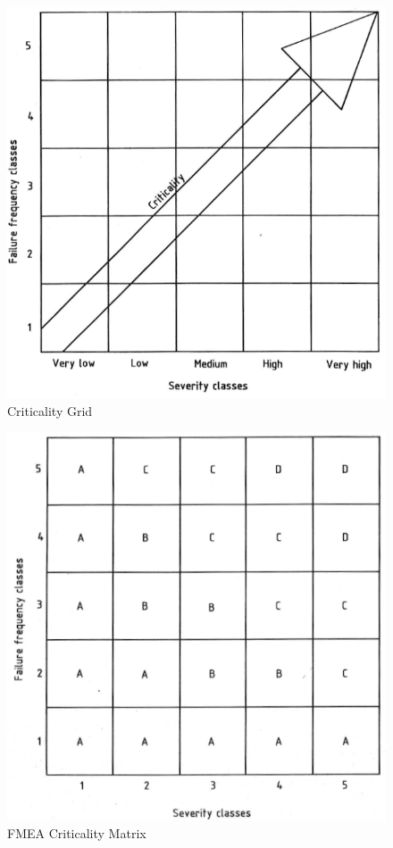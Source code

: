 \documentclass[./dissertation.tex]{subfiles}
\begin{document}
\begin{figure}
	\includegraphics[width=\linewidth]{subfiles/imgs/fmea_criticality_grid.png}
  \caption{Criticality Grid}
	\label{fig:criticality_grid}
\end{figure}


\begin{figure}
	\includegraphics[width=\linewidth]{subfiles/imgs/fmea_criticality_matrix_with_bands.png}
  \caption{FMEA Criticality Matrix}
  \label{fig:criticality_matrix}
\end{figure}
\end{document}
